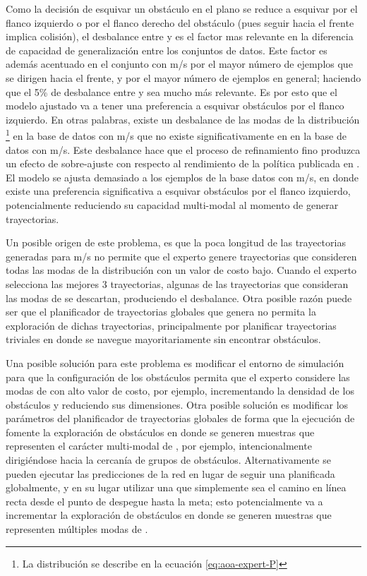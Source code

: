 Como la decisión de esquivar un obstáculo en el plano  se reduce a esquivar por el flanco izquierdo o por el flanco derecho del obstáculo (pues seguir hacia el frente implica colisión), el desbalance entre  y  es el factor mas relevante en la diferencia de capacidad de generalización entre los conjuntos de datos. Este factor es además acentuado en el conjunto con  m/s por el mayor número de ejemplos que se dirigen hacia el frente, y por el mayor número de ejemplos en general; haciendo que el 5\% de desbalance entre  y  sea mucho más relevante. Es por esto que el modelo ajustado va a tener una preferencia a esquivar obstáculos por el flanco izquierdo. En otras palabras, existe un desbalance de las modas de la distribución \footnote{La distribución  se describe en la ecuación \ref{eq:aoa-expert-P}} en la base de datos con  m/s que no existe significativamente en en la base de datos con  m/s. Este desbalance hace que el proceso de refinamiento fino produzca un efecto de sobre-ajuste con respecto al rendimiento de la política publicada en \cite{Loquercio2021}. El modelo se ajusta demasiado a los ejemplos de la base datos con  m/s, en donde existe una preferencia significativa a esquivar obstáculos por el flanco izquierdo, potencialmente reduciendo su capacidad multi-modal al momento de generar trayectorias.

Un posible origen de este problema, es que la poca longitud de las trayectorias generadas para  m/s no permite que el experto genere trayectorias que consideren todas las modas de la distribución  con un valor de costo bajo. Cuando el experto selecciona las mejores 3 trayectorias, algunas de las trayectorias que consideran las modas de  se descartan, produciendo el desbalance. Otra posible razón puede ser que el planificador de trayectorias globales que genera  no permita la exploración de dichas trayectorias, principalmente por planificar trayectorias triviales en donde se navegue mayoritariamente sin encontrar obstáculos. 

Una posible solución para este problema es modificar el entorno de simulación para que la configuración de los obstáculos permita que el experto considere las modas de  con alto valor de costo, por ejemplo, incrementando la densidad de los obstáculos y reduciendo sus dimensiones. Otra posible solución es modificar los parámetros del planificador de trayectorias globales de forma que la ejecución de  fomente la exploración de obstáculos en donde se generen muestras que representen el carácter multi-modal de , por ejemplo, intencionalmente dirigiéndose hacia la cercanía de grupos de obstáculos. Alternativamente se pueden ejecutar las predicciones de la red en lugar de seguir una  planificada globalmente, y en su lugar utilizar una  que simplemente sea el camino en línea recta desde el punto de despegue hasta la meta; esto potencialmente va a incrementar la exploración de obstáculos en donde se generen muestras que representen múltiples modas de .

